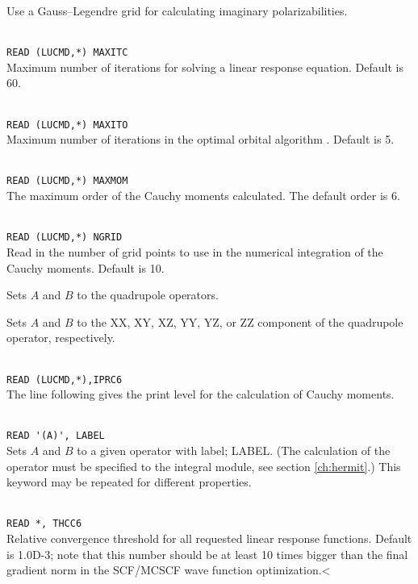 \begin{description}
\item{} Use a Gauss--Legendre grid for calculating imaginary polarizabilities.

\item{}\\
\verb|READ (LUCMD,*) MAXITC|\\
Maximum number of iterations for solving a linear response
equation. Default is 60.

\item{}\\
\verb|READ (LUCMD,*) MAXITO|\\
Maximum number of iterations in the optimal orbital
algorithm
\cite{tuhjahjajpjjcp84}.
Default is 5.

\item{}\\
\verb|READ (LUCMD,*) MAXMOM|\\
The maximum order of the Cauchy moments calculated. The default order is 6.

\item{}\\
\verb|READ (LUCMD,*) NGRID|\\
Read in the number of grid points to use in the numerical integration of the Cauchy moments. Default is 10.

\item{}
Sets $A$ and $B$ to the quadrupole operators.

\item{}
Sets $A$ and $B$ to the XX, XY, XZ, YY, YZ, or ZZ component of the
quadrupole operator, respectively.

\item{}     \\
\verb|READ (LUCMD,*),IPRC6 |\\
   The line following gives the print level for the calculation of Cauchy moments.

\item{}\\
\verb|READ '(A)', LABEL|\\
Sets $A$ and $B$ to a given operator with label; LABEL.
(The calculation of the operator must be specified to the integral
module, see section \ref{ch:hermit}.)
This keyword may be repeated for different properties.

\item{}\\
\verb|READ *, THCC6|\\
Relative convergence threshold for all requested linear response functions.
Default is 1.0D-3; note that this number should be at least 10 times
bigger than the final gradient norm in the SCF/MCSCF
wave function optimization.<
\end{description}


